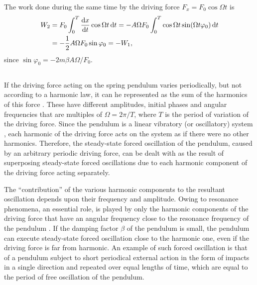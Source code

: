 The work done during the same time by the driving force $F_{x} = F_{0}\cos \Omega t$ is
\begin{align*}%
W_{2} & = F_{0} \int_{0}^{T} \dv{x}{t} \cos \Omega t \, \dd t = - A\Omega F_{0} \int_{0}^{T} \cos \Omega t \sin(\Omega t  \varphi_{0}) \, \dd t \\
& = -\frac{1}{2} A \Omega F_{0} \sin \varphi_{0} = - W_{1},
\end{align*}
since $\sin \varphi_{0} = -2m\beta A \Omega/F_{0}$.

\subsection{}\label{29.2.7} If the driving force acting on the spring pendulum varies periodically, but not according to a harmonic law, it can he represented as the sum of the harmonics of this force . These have different amplitudes, initial phases and angular frequencies that are multiples of $\Omega = 2\pi/T$, where $T$ is the period of variation of the driving force. Since the pendulum is a linear vibratory (or oscillatory) system , each harmonic of the driving force acts on the system as if there were no other harmonics. Therefore, the steady-state forced oscillation of the pendulum, caused by an arbitrary periodic driving force, can be dealt with as the result of superposing steady-state forced oscillations due to each harmonic component of the driving force acting separately. 

The ``contribution'' of the various harmonic components to the resultant oscillation depends upon their frequency and amplitude. Owing to resonance phenomena, an essential role, is played by only the harmonic components of the driving force that have an angular frequency close to the resonance frequency of the pendulum . If the damping factor $\beta$ of the pendulum is small, the pendulum can execute steady-state forced oscillation close to the harmonic one, even if the driving force is far from harmonic. An example of such forced oscillation is that of a pendulum subject to short periodical external action in the form of impacts in a single direction and repeated over equal lengths of time, which are equal to the period of free oscillation of the pendulum.

